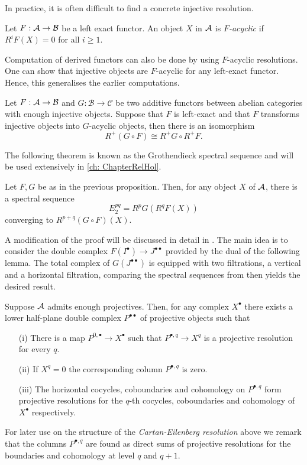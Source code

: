 In practice, it is often difficult to find a concrete injective resolution.
\begin{definition}
 Let $F:\AA \to \mathcal{B}$ be a left exact functor.
 An object $X$ in $\AA$ is {\it $F$-acyclic} if $R^iF(X) = 0$ for all $i\geq 1$.
\end{definition}
Computation of derived functors can also be done by using $F$-acyclic resolutions.
One can show that injective objects are $F$-acyclic for any left-exact functor.
Hence, this generalises the earlier computations.
\begin{proposition}{\cite[Theorem 1.3.18.]{dimca2004sheaves}}\label{prop: GrothendieckIsomorphism}
  Let $F:\AA \to \mathcal{B}$ and $G:\mathcal{B}\to \mathcal{C}$ be two additive functors between abelian categories with enough injective objects. Suppose that $F$ is left-exact and that $F$ transforms injective objects into $G$-acyclic objects, then there is an isomorphism
  $$R^+(G\circ F) \cong R^+G \circ R^+ F.$$
\end{proposition}
The following theorem is known as the Grothendieck spectral sequence and will be used extensively in \cref{ch: ChapterRelHol}.
\begin{theorem}{\cite[Theorem 1.3.19.]{dimca2004sheaves}}\label{thm: GrothendieckSpectral}
  Let $F,G$ be as in the previous proposition. Then, for any object $X$ of $\AA$, there is a spectral sequence
  $$E_2^{pq} = R^pG(R^qF(X)) $$
  converging to $R^{p+q}(G\circ F)(X).$
\end{theorem}
  A modification of the proof will be discussed in detail in .
  The main idea is to consider the double complex $F(I^\bullet)\to J^{\bullet\bullet}$ provided by the dual of the following lemma.
  The total complex of $G(J^{\bullet\bullet})$ is equipped with two filtrations, a vertical and a horizontal filtration, comparing the spectral sequences from  then yields the desired result.
\begin{proposition}{\cite[Lemma 5.7.2.]{weibel1995introduction}}\label{prop: Cartan-Eilenberg}
  Suppose $\AA$ admits enough projectives.
  Then, for any complex $X^\bullet$ there exists a lower half-plane double complex $P^{\bullet\bullet}$ of projective objects such that
  \begin{enumerate}
    \item[(i)] There is a map $P^{0,\bullet}\to X^\bullet$ such that $P^{\bullet,q}\to X^{q}$ is a projective resolution for every $q$.
    \item[(ii)] If $X^q = 0$ the corresponding column $P^{\bullet,q}$ is zero.
    \item[(iii)] The horizontal cocycles, coboundaries and cohomology on $P^{\bullet,q}$ form projective resolutions for the $q$-th cocycles, coboundaries and cohomology of $X^\bullet$ respectively.
  \end{enumerate}
\end{proposition}
For later use on the structure of the {\it Cartan-Eilenberg resolution} above we remark that the columns $P^{\bullet,q}$ are found as direct sums of projective resolutions for the boundaries and cohomology at level $q$ and $q+1$.

